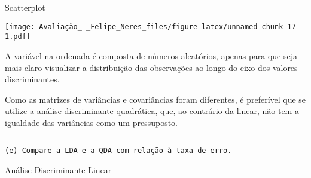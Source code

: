 \documentclass[]{article}
\newenvironment{Shaded}{\begin{snugshade}}{\end{snugshade}}
\newcommand{\KeywordTok}[1]{\textcolor[rgb]{0.13,0.29,0.53}{\textbf{#1}}}
\newcommand{\DataTypeTok}[1]{\textcolor[rgb]{0.13,0.29,0.53}{#1}}
\newcommand{\DecValTok}[1]{\textcolor[rgb]{0.00,0.00,0.81}{#1}}
\newcommand{\StringTok}[1]{\textcolor[rgb]{0.31,0.60,0.02}{#1}}
\newcommand{\OperatorTok}[1]{\textcolor[rgb]{0.81,0.36,0.00}{\textbf{#1}}}
\newcommand{\NormalTok}[1]{#1}
\begin{document}
Scatterplot

\begin{Shaded}
\end{Shaded}

\texttt{[image: Avaliação\_-\_Felipe\_Neres\_files/figure-latex/unnamed-chunk-17-1.pdf]}

A variável na ordenada é composta de números aleatórios, apenas para que
seja mais claro visualizar a distribuição das observações ao longo do
eixo dos valores discriminantes.

Como as matrizes de variâncias e covariâncias foram diferentes, é
preferível que se utilize a análise discriminante quadrática, que, ao
contrário da linear, não tem a igualdade das variâncias como um
pressuposto.

\begin{center}\rule{0.5\linewidth}{\linethickness}\end{center}

\begin{verbatim}
(e) Compare a LDA e a QDA com relação à taxa de erro. 
\end{verbatim}

Análise Discriminante Linear
\end{document}
